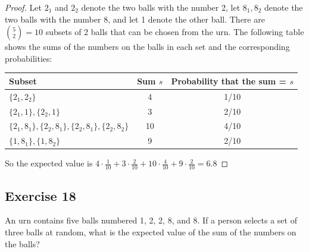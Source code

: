 \documentclass[14pt]{extarticle}
\begin{document}
\begin{proof}
     Let \(2_1\) and \(2_2\) denote the two balls with the number 2, let \(8_1, 8_2\) denote the two balls with the number 8,
     and let 1 denote the other ball. There are \(\binom{5}{2} = 10\) subsets of 2 balls that can be chosen from the urn. The
     following table shows the sums of the numbers on the balls in each set and the corresponding probabilities:
     \begin{center}
          \begin{tabular}{|l|c|c|}
               \hline
               {\bf Subset}                                           & {\bf Sum \(s\)} & {\bf Probability that the sum = \(s\)} \\
               \hline
               \(\{2_1, 2_2\}\)                                       & 4               & 1/10                                   \\
               \hline
               \(\{2_1,1\}, \{2_2,1\}\)                               & 3               & 2/10                                   \\
               \hline
               \(\{2_1,8_1\}, \{2_2,8_1\}, \{2_2,8_1\}, \{2_2,8_2\}\) & 10              & 4/10                                   \\
               \hline
               \(\{1,8_1\}, \{1,8_2\}\)                               & 9               & 2/10                                   \\
               \hline
          \end{tabular}
     \end{center}
     So the expected value is \(4 \cdot \frac{1}{10} + 3 \cdot \frac{2}{10} + 10 \cdot \frac{4}{10} + 9 \cdot \frac{2}{10} =
     6.8\)
\end{proof}

\subsection{Exercise 18}
An urn contains five balls numbered 1, 2, 2, 8, and 8. If a person selects a set of three balls at random, what is the
expected value of the sum of the numbers on the balls?
\end{document}
